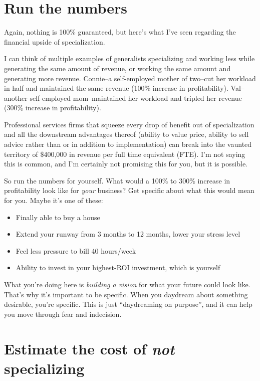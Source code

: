 \section{Run the numbers}

Again, nothing is 100\% guaranteed, but here's what I've seen regarding the financial upside of specialization.

I can think of multiple examples of generalists specializing and working less while generating the same amount of revenue, or working the same amount and generating more revenue. Connie--a self-employed mother of two--cut her workload in half and maintained the same revenue (100\% increase in profitability). Val--another self-employed mom--maintained her workload and tripled her revenue (300\% increase in profitability).

Professional services firms that squeeze every drop of benefit out of specialization and all the downstream advantages thereof (ability to value price, ability to sell advice rather than or in addition to implementation) can break into the vaunted territory of \$400,000 in revenue per full time equivalent (FTE). I'm not saying this is common, and I'm certainly not promising this for you, but it is possible.

So run the numbers for yourself. What would a 100\% to 300\% increase in profitability look like for \emph{your} business? Get specific about what this would mean for you. Maybe it's one of these:

\begin{itemize}
\item Finally able to buy a house
\item Extend your runway from 3 months to 12 months, lower your stress level
\item Feel less pressure to bill 40 hours/week
\item Ability to invest in your highest-ROI investment, which is yourself
\end{itemize}

What you're doing here is \emph{building a vision} for what your future could look like. That's why it's important to be specific. When you daydream about something desirable, you're specific. This is just ``daydreaming on purpose'', and it can help you move through fear and indecision.

\section{Estimate the cost of \emph{not} specializing}

